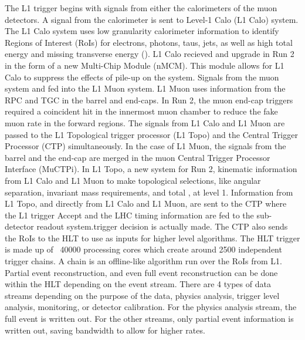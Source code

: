 \indent The L1 trigger begins with signals from either the calorimeters of the muon detectors. A signal from the calorimeter is sent to Level-1 Calo (L1 Calo) system. The L1 Calo system uses low granularity calorimeter information to identify Regions of Interest (RoIs) for electrons, photons, taus, jets, as well as high total energy and missing transverse energy (\met). L1 Calo recieved and upgrade in Run 2 in the form of a new Multi-Chip Module (nMCM). This module allows for L1 Calo to suppress the effects of pile-up on the system. \linebreak
\indent Signals from the muon system and fed into the L1 Muon system. L1 Muon uses information from the RPC and TGC in the barrel and end-caps. In Run 2, the muon end-cap triggers required a coincident hit in the innermost muon chamber to reduce the fake muon rate in the forward regions.\linebreak
\indent The signals from L1 Calo and L1 Muon are passed to the L1 Topological trigger processor (L1 Topo) and the Central Trigger Processor (CTP) simultaneously. In the case of L1 Muon, the signals from the barrel and the end-cap are merged in the muon Central Trigger Processor Interface  (MuCTPi). In L1 Topo, a new system for Run 2, kinematic information from L1 Calo and L1 Muon to make topological selections, like angular separation, invariant mass requirements, and total \met , at level 1.\linebreak
\indent Information from L1 Topo, and directly from L1 Calo and L1 Muon, are sent to the CTP where the L1 trigger Accept and the LHC timing information are fed to the sub-detector readout system.trigger decision is actually made. The CTP also sends the RoIs to the HLT to use as inputs for higher level algorithms.\linebreak
\indent The HLT trigger is made up of ~40000 processing cores which create around 2500 independent trigger chains. A chain is an offline-like algorithm run over the RoIs from L1. Partial event reconstruction, and even full event reconstruction can be done within the HLT depending on the event stream. There are 4 types of data streams depending on the purpose of the data, physics analysis, trigger level analysis, monitoring, or detector calibration. For the physics analysis stream, the full event is written out. For the other streams, only partial event information is written out, saving bandwidth to allow for higher rates.\linebreak
